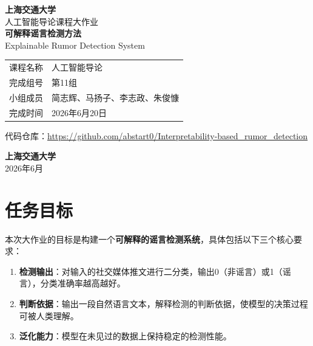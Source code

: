\documentclass[12pt,a4paper]{article}
\begin{document}
\begin{titlepage}

\centering

\vspace*{1.5cm}

{\Huge\bfseries 上海交通大学}\\[0.5cm]

{\Large 人工智能导论课程大作业}\\[3cm]

{\LARGE\bfseries 可解释谣言检测方法}\\[0.8cm]

{\large Explainable Rumor Detection System}\\[3cm]

\renewcommand{\arraystretch}{1.8}

\begin{tabular}{p{4cm}p{8cm}}
\hline
课程名称 & 人工智能导论 \\
完成组号 & 第11组 \\
小组成员 & 简志辉、马扬子、李志政、朱俊慷 \\
完成时间 & 2026年6月20日 \\
\hline
\end{tabular}

\vspace{1.5cm}

{\small 代码仓库：\url{https://github.com/abstart0/Interpretability-based_rumor_detection}}

\vfill

{\Large\bfseries 上海交通大学}\\[0.3cm]

2026年6月

\end{titlepage}



\section{任务目标}

本次大作业的目标是构建一个\textbf{可解释的谣言检测系统}，具体包括以下三个核心要求：

\begin{enumerate}[leftmargin=2em]
    \item \textbf{检测输出}：对输入的社交媒体推文进行二分类，输出0（非谣言）或1（谣言），分类准确率越高越好。
    \item \textbf{判断依据}：输出一段自然语言文本，解释检测的判断依据，使模型的决策过程可被人类理解。
    \item \textbf{泛化能力}：模型在未见过的数据上保持稳定的检测性能。
\end{enumerate}
\end{document}
